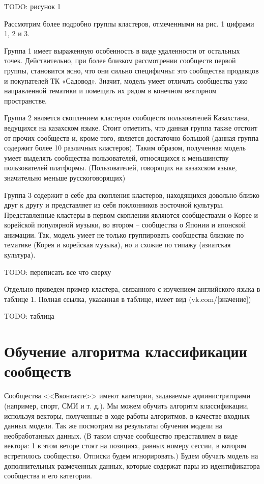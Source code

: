 \documentclass[times,specification,annotation]{itmo-student-thesis}
\begin{document}
TODO: рисунок 1

Рассмотрим более подробно группы кластеров, отмеченными на рис. 1
цифрами 1, 2 и 3.

Группа 1 имеет выраженную особенность в виде удаленности от остальных
точек. Действительно, при более близком рассмотрении сообществ первой группы,
становится ясно, что они сильно специфичны: это сообщества продавцов и
покупателей ТК «Садовод». Значит, модель умеет отличать сообщества узко
направленной тематики и помещать их рядом в конечном векторном пространстве.

Группа 2 является скоплением кластеров сообществ пользователей
Казахстана, ведущихся на казахском языке. Стоит отметить, что данная группа
также отстоит от прочих сообществ и, кроме того, является достаточно большой
(данная группа содержит более 10 различных кластеров). Таким образом,
полученная модель умеет выделять сообщества пользователей, относящихся к
меньшинству пользователей платформы. (Пользователей, говорящих на казахском
языке, значительно меньше русскоговорящих)

Группа 3 содержит в себе два скопления кластеров, находящихся довольно
близко друг к другу и представляет из себя поклонников восточной культуры.
Представленные кластеры в первом скоплении являются сообществами о Корее и
корейской популярной музыки, во втором – сообщества о Японии и японской
анимации. Так, модель умеет не только группировать сообщества близкие по
тематике (Корея и корейская музыка), но и схожие по типажу (азиатская культура).

TODO: переписать все что сверху

Отдельно приведем пример кластера, связанного с изучением английского
языка в таблице 1. Полная ссылка, указанная в таблице, имеет вид
(vk.com/[значение])

TODO: таблица

\section{Обучение алгоритма классификации сообществ}

Сообщества <<Вконтакте>> имеют категории, задаваемые администраторами
(например, спорт, СМИ и т. д.). Мы можем обучить алгоритм классификации,
используя векторы, полученные в ходе работы алгоритмов, в качестве входных
данных модели. Так же посмотрим на результаты обучения модели на необработанных данных. (В таком случае сообщество представляем в виде вектора: 1 в этом веторе стоят на позициях, равных номеру сессии, в котором встретилось сообщество. Отписки будем игнорировать.)  
Будем обучать модель на дополнительных размеченных данных,
которые содержат пары из идентификатора сообщества и его категории.
\end{document}
